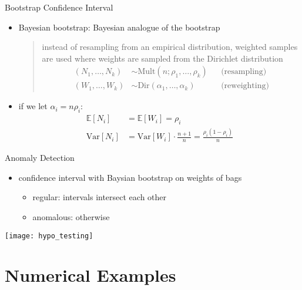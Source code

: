 \documentclass[fleqn,aspectratio=1610]{beamer}
\begin{document}
\begin{frame}[label={sec:org2fd2478}]{Bootstrap Confidence Interval}
\begin{itemize}
\item Bayesian bootstrap: Bayesian analogue of the bootstrap
\begin{quote}
  instead of resampling from an empirical distribution,
  weighted samples are used where weights are sampled
  from the Dirichlet distribution
  \begin{align}
    (N_{1},\dotsc,N_{k})
    &\sim \mathrm{Mult}(n;\rho_{1},\dotsc,\rho_{k})
    &&\text{(resampling)}
    \\
    (W_{1},\dotsc,W_{k})
    &\sim \mathrm{Dir}(\alpha_{1},\dotsc,\alpha_{k})
    &&\text{(reweighting)}
  \end{align}
\end{quote}
\item if we let \(\alpha_{i}=n\rho_{i}\):
\begin{align}
  \mathbb{E}[N_{i}]&=\mathbb{E}[W_{i}]=\rho_{i}\\
  \mathrm{Var}[N_{i}]&=\mathrm{Var}[W_{i}]\cdot\frac{n+1}{n}
                     =\frac{\rho_{i}(1-\rho_{i})}{n}
\end{align}
\end{itemize}
\end{frame}

\begin{frame}[label={sec:org0466614}]{Anomaly Detection}
\begin{itemize}
\item confidence interval with Baysian bootstrap on weights of bags
\begin{itemize}
\item \alert{regular:} intervals intersect each other
\item \alert{anomalous:} otherwise
\end{itemize}
\end{itemize}
\begin{center}
\texttt{[image: hypo\_testing]}
\end{center}
\end{frame}


\section{Numerical Examples}
\label{sec:org082c2f3}
\end{document}

